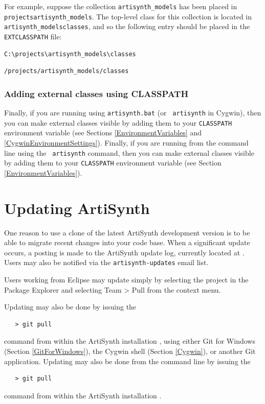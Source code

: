 For example, suppose the collection {\tt artisynth\_models}
has been placed in {\tt \TOP projects\SEP artisynth\_models}.
The top-level class \directory{} for this collection is located
in {\tt artisynth\_models\SEP classes}, and so the following entry
should be placed in the {\tt EXTCLASSPATH} file:

\ifWindows
\begin{verbatim}
C:\projects\artisynth_models\classes
\end{verbatim}
\else
\begin{verbatim}
/projects/artisynth_models/classes
\end{verbatim}
\fi

\subsubsection{Adding external classes using CLASSPATH}

\ifWindows
Finally, if you are running using {\tt artisynth.bat} (or {\tt
artisynth} in Cygwin), then you can make external classes visible by
adding them to your {\tt CLASSPATH} environment variable (see Sections
\ref{EnvironmentVariables} and \ref{CygwinEnvironmentSettings}).
\else
Finally, if you are running from the command line using the {\tt
artisynth} command, then you can make external classes visible by adding
them to your {\tt CLASSPATH} environment variable (see Section
\ref{EnvironmentVariables}).
\fi

\section{Updating ArtiSynth}
\label{UpdatingArtiSynth}

One reason to use a clone of the latest ArtiSynth
development version is to be able to migrate recent changes into your
code base. When a significant update occurs, a posting is made to the
ArtiSynth update log, currently located at
.
Users may also be notified via the {\tt artisynth-updates} email list.

Users working from Eclipse may update simply by selecting
the project in the {\sf Package Explorer} and selecting {\sf Team >
Pull} from the context menu.

\ifWindows
Updating may also be done by issuing the 
\begin{verbatim}
   > git pull
\end{verbatim}
command from within the ArtiSynth installation \directory{}, 
using either Git for Windows (Section \ref{GitForWindows}),
the Cygwin shell (Section \ref{Cygwin}), or another Git application.
\else
Updating may also be done from the command line by issuing the 
\begin{verbatim}
   > git pull
\end{verbatim}
command from within the ArtiSynth installation \directory{}.
\fi

